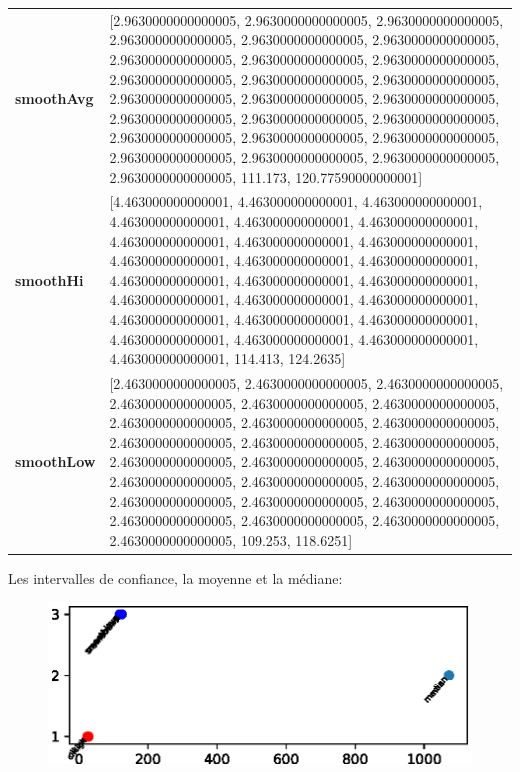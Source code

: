 						\begin{table}[H]
							\centering
							\begin{tabularx}{\textwidth}{lX}
		\textbf{smoothAvg}&  [2.9630000000000005, 2.9630000000000005, 2.9630000000000005, 2.9630000000000005, 2.9630000000000005, 2.9630000000000005, 2.9630000000000005, 2.9630000000000005, 2.9630000000000005, 2.9630000000000005, 2.9630000000000005, 2.9630000000000005, 2.9630000000000005, 2.9630000000000005, 2.9630000000000005, 2.9630000000000005, 2.9630000000000005, 2.9630000000000005, 2.9630000000000005, 2.9630000000000005, 2.9630000000000005, 2.9630000000000005, 2.9630000000000005, 2.9630000000000005, 2.9630000000000005, 111.173, 120.77590000000001] \\
		\textbf{smoothHi}& [4.463000000000001, 4.463000000000001, 4.463000000000001, 4.463000000000001, 4.463000000000001, 4.463000000000001, 4.463000000000001, 4.463000000000001, 4.463000000000001, 4.463000000000001, 4.463000000000001, 4.463000000000001, 4.463000000000001, 4.463000000000001, 4.463000000000001, 4.463000000000001, 4.463000000000001, 4.463000000000001, 4.463000000000001, 4.463000000000001, 4.463000000000001, 4.463000000000001, 4.463000000000001, 4.463000000000001, 4.463000000000001, 114.413, 124.2635] \\
		\textbf{smoothLow} &[2.4630000000000005, 2.4630000000000005, 2.4630000000000005, 2.4630000000000005, 2.4630000000000005, 2.4630000000000005, 2.4630000000000005, 2.4630000000000005, 2.4630000000000005, 2.4630000000000005, 2.4630000000000005, 2.4630000000000005, 2.4630000000000005, 2.4630000000000005, 2.4630000000000005, 2.4630000000000005, 2.4630000000000005, 2.4630000000000005, 2.4630000000000005, 2.4630000000000005, 2.4630000000000005, 2.4630000000000005, 2.4630000000000005, 2.4630000000000005, 2.4630000000000005, 109.253, 118.6251]\\
	\end{tabularx} 
\end{table}

Les intervalles de confiance, la moyenne et la médiane: 
\begin{figure}[H]
\centering
\includegraphics[width=1\linewidth]{illustrations/2018-01-0203:04:21-}
\caption{}
\label{fig:2018-01-0203:04:21-}
\end{figure}

